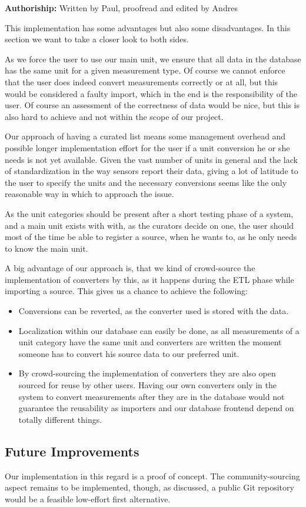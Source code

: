 \textbf{Authoriship:} Written by Paul, proofread and edited by Andres
\vspace{10 pt}

This implementation has some advantages but also some disadvantages. In
this section we want to take a closer look to both sides.

As we force the user to use our main unit, we ensure that all data in
the database has the same unit for a given measurement type. Of course
we cannot enforce that the user does indeed convert measurements
correctly or at all, but this would be considered a faulty import, which
in the end is the responsibility of the user. Of course an assessment of
the correctness of data would be nice, but this is also hard to achieve
and not within the scope of our project.

Our approach of having a curated list means some management overhead and
possible longer implementation effort for the user if a unit conversion
he or she needs is not yet available. Given the vast number of units in
general and the lack of standardization in the way sensors report their
data, giving a lot of latitude to the user to specify the units and the
necessary conversions seems like the only reasonable way in which to
approach the issue.

As the unit categories should be present after a short testing phase of
a system, and a main unit exists with with, as the curators decide on
one, the user should most of the time be able to register a source, when
he wants to, as he only needs to know the main unit.

A big advantage of our approach is, that we kind of crowd-source the
implementation of converters by this, as it happens during the ETL phase
while importing a source. This gives us a chance to achieve the following:

\begin{itemize}
\tightlist
\item
  Conversions can be reverted, as the converter used is stored with the
  data.
\item
  Localization within our database can easily be done, as all
  measurements of a unit category have the same unit and converters are
  written the moment someone has to convert his source data to our
  preferred unit.
\item
  By crowd-sourcing the implementation of converters they are also open
  sourced for reuse by other users. Having our own converters only in
  the system to convert measurements after they are in the database
  would not guarantee the reusability as importers and our database
  frontend depend on totally different things.
\end{itemize}

\subsection{Future Improvements}\label{future-improvements}

Our implementation in this regard is a proof of concept. The
community-sourcing aspect remains to be implemented, though, as
discussed, a public Git repository would be a feasible low-effort first
alternative.
